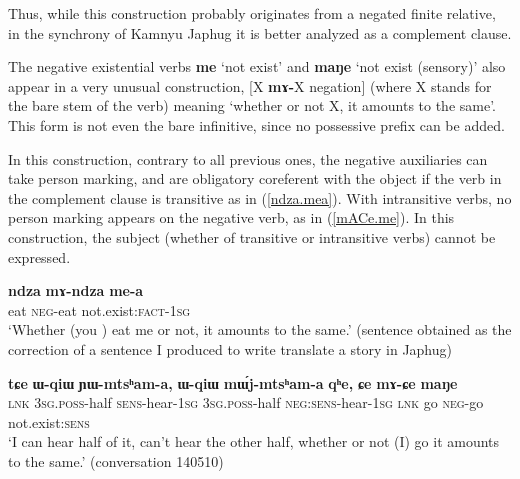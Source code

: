 \documentclass[oneside,a4paper,11pt]{article}
\newcommand{\ipa}[1]{\textbf{\phon#1}} %
\newcommand{\jpg}[2]{\ipa{#1} `#2'} %
\newcommand{\refb}[1]{(\ref{#1})}
\begin{document}
Thus, while this construction probably originates from a negated finite relative, in the synchrony of Kamnyu Japhug it is better analyzed as a complement clause.


The negative existential verbs  \jpg{me}{not exist} and \jpg{maŋe}{not exist (sensory)} also appear in a very unusual construction, [X \ipa{mɤ-}X negation] (where X stands for the bare stem of the verb) meaning `whether or not X, it amounts to the same'. This form is not even the bare infinitive, since no possessive prefix can be added.

In this construction, contrary to all previous ones, the negative auxiliaries can take person marking, and are obligatory coreferent with the object if the verb in the complement clause is transitive as in \refb{ndza.mea}. With intransitive verbs, no person marking appears on the negative verb, as in \refb{mACe.me}. In this construction, the subject (whether of transitive or intransitive verbs) cannot be expressed.

\begin{exe}
\ex \label{ndza.mea}
\gll \ipa{ndza} 	\ipa{mɤ-ndza} 	\ipa{me-a} \\
eat \textsc{neg}-eat not.exist:\textsc{fact}-\textsc{1sg} \\
\glt `Whether (you ) eat me or not, it amounts to the same.' (sentence obtained as the correction of a sentence I produced to write translate a story in Japhug)
\end{exe}

\begin{exe}
\ex \label{mACe.me}
\gll
\ipa{tɕe} 	\ipa{ɯ-qiɯ} 	\ipa{ɲɯ-mtsʰam-a,} 	\ipa{ɯ-qiɯ} 	\ipa{mɯ́j-mtsʰam-a} 	\ipa{qʰe,} 	\ipa{ɕe} 	\ipa{mɤ-ɕe} 	\ipa{maŋe}  \\
\textsc{lnk} \textsc{3sg.poss}-half \textsc{sens}-hear-\textsc{1sg} \textsc{3sg.poss}-half \textsc{neg:sens}-hear-\textsc{1sg} \textsc{lnk} go \textsc{neg}-go not.exist:\textsc{sens} \\
\glt  `I can hear half of it, can't hear the other half, whether or not (I) go it amounts to the same.' (conversation 140510)
\end{exe}
\end{document}
